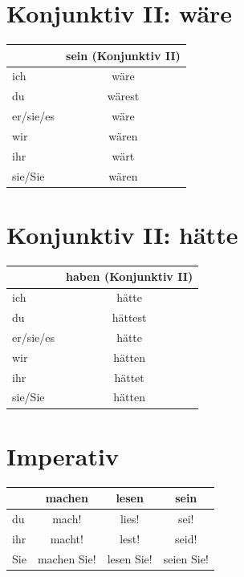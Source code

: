 \section{Konjunktiv II: wäre}
\label{sec:KonjunktivIIwaere}

\begin{center}
\begin{tabular}{|l|c|}
\hline
\textbf{} & \textbf{sein (Konjunktiv II)} \\ \hline
ich & wäre \\ \hline
du & wärest \\ \hline
er/sie/es & wäre \\ \hline
wir & wären \\ \hline
ihr & wärt \\ \hline
sie/Sie & wären \\ \hline
\end{tabular}
\end{center}

\section{Konjunktiv II: hätte}
\label{sec:KonjunktivIIhaette}

\begin{center}
\begin{tabular}{|l|c|}
\hline
\textbf{} & \textbf{haben (Konjunktiv II)} \\ \hline
ich & hätte \\ \hline
du & hättest \\ \hline
er/sie/es & hätte \\ \hline
wir & hätten \\ \hline
ihr & hättet \\ \hline
sie/Sie & hätten \\ \hline
\end{tabular}
\end{center}

\section{ Imperativ}
\label{sec:Imperativ}

\begin{center}
\begin{tabular}{|l|c|c|c|}
\hline
\textbf{} & \textbf{machen} & \textbf{lesen} & \textbf{sein} \\ \hline
du & mach! & lies! & sei! \\ \hline
ihr & macht! & lest! & seid! \\ \hline
Sie & machen Sie! & lesen Sie! & seien Sie! \\ \hline
\end{tabular}
\end{center}


